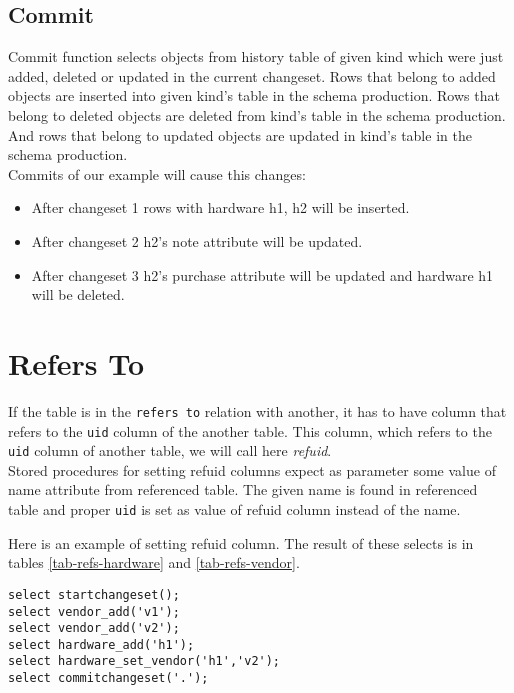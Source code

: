 \documentclass[deska]{subfiles}
\begin{document}
\subsection{Commit}
Commit function selects objects from history table of given kind which were just added, deleted or updated in the current changeset. Rows that belong to added objects are inserted into given kind's table in the schema production. Rows that belong to deleted objects are deleted from kind's table in the schema production. And rows that belong to updated objects are updated in kind's table in the schema production.\\
Commits of our example will cause this changes:
\begin{itemize}
    \item After changeset 1 rows with hardware h1, h2 will be inserted.
    \item After changeset 2 h2's note attribute will be updated.
    \item After changeset 3 h2's purchase attribute will be updated and hardware h1 will be deleted.
\end{itemize}

\section{Refers To}
\label{sec:db-refs-to}
If the table is in the {\tt refers to} relation with another, it has to have column that refers to the {\tt uid} column of the another table. This column, which refers to the {\tt uid} column of another table, we will call here {\em refuid}.\\
Stored procedures for setting refuid columns expect as parameter some value of name attribute from referenced table. The given name is found in referenced table and proper {\tt uid} is set as value of refuid column instead of the name.

Here is an example of setting refuid column. The result of these selects is in tables \ref{tab-refs-hardware} and  \ref{tab-refs-vendor}.
\begin{verbatim}
select startchangeset();
select vendor_add('v1');
select vendor_add('v2');
select hardware_add('h1');
select hardware_set_vendor('h1','v2');
select commitchangeset('.');
\end{verbatim}
\end{document}
